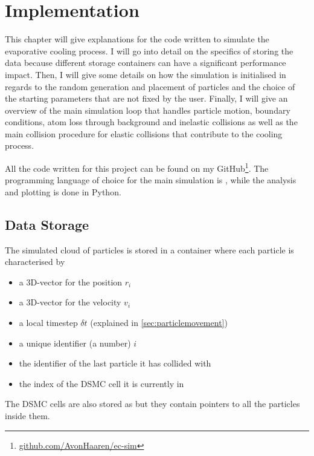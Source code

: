 

\chapter{Implementation}
This chapter will give explanations for the code written to simulate the evaporative cooling process. I will go into detail on the specifics of storing the data because different storage containers can have a significant performance impact. Then, I will give some details on how the simulation is initialised in regards to the random generation and placement of particles and the choice of the starting parameters that are not fixed by the user. Finally, I will give an overview of the main simulation loop that handles particle motion, boundary conditions, atom loss through background and inelastic collisions as well as the main collision procedure for elastic collisions that contribute to the cooling process.

All the code written for this project can be found on my GitHub\footnote{\url{github.com/AvonHaaren/ec-sim}}. The programming language of choice for the main simulation is \Cpp, while the analysis and plotting is done in Python. 
%
\section{Data Storage}
\label{sec:eva_data_storage}
%
The simulated cloud of particles is stored in a \stdvector container where each particle is characterised by
\begin{itemize}
    \item a 3D-vector for the position $r_i$
    \item a 3D-vector for the velocity $v_i$
    \item a local timestep $\delta t$ (explained in \cref{sec:particlemovement})
    \item a unique identifier (a number) $i$
    \item the identifier of the last particle it has collided with
    \item the index of the DSMC cell it is currently in
\end{itemize}
%
The DSMC cells are also stored as \stdvector but they contain pointers to all the particles inside them.

